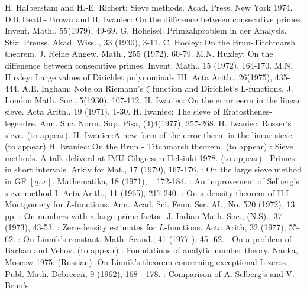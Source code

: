 \begin{thebibliography}{99}
 { H. Halberstam and H.-E. Richert}: Sieve methods. Acad,
  Press, New York 1974. 
 { D.R Heath- Brown and H. Iwaniec}: On the difference
  between consecutive primes. Invent. Math., 55(1979), 49-69. 
 {G. Hoheisel}: Primzahproblem in der
  Analysis. Stiz. Preuss. Akad. Wiss.., 33 (1930), 3-11. 
 { C. Hooley}: On the Brun-Titchmarsh theorem. J. Reine
  Angew. Math.,  255 (1972). 60-79. 
 { M.N. Huxley}: On the diffenence between consecutive
  primes. Invent. Math., 15 (1972), 164-170. 
 { M.N. Huxley}: Large values of Dirichlet polynominals
  III. Acta Arith., 26(1975), 435-444. 
 { A.E. Ingham}: Note on Riemann's $\zeta$ function and
  Dirichlet's L-functions. J. London Math. Soc., 5(1930), 107-112. 
 { H.  Iwaniec}: On the error eerm in the linear
  sieve. Acta Arith., 19 (1971), 1-30. 
 { H. Iwaniec}: The sieve of Eratosthenes-
  legendre. Ann. Suc. Norm. Sup. Pisa, (4)4(1977), 257-268. 
 { H.  Iwaniec}: Rosser's sieve. (to appear). 
 { H. Iwaniec}:\pageoriginale A new  form of the error-therm in the
  linear sieve. (to appear) 
 {H. Iwaniec}: On the Brun - Titchmarsh theorem. (to appear)
: Sieve methods. A talk deliverd at   IMU
  Cibgressm Helsinki 1978. (to appear) 
: Primes in short
  intervals. Arkiv for  Mat., 17 (1979),  167-176. 
: On the large sieve method in  GF
  $[q,x]$. Mathematika,  18 (1971), ~ 172-184.  
: An improvement of
  Selberg's sieve method I. Acta Arith., 11 (1965),  217-240. 
: On a density theorem of H.L. Montgomery for
  $L$-functions. Ann. Acad. Sci. Fenn. Ser. AI., No. 520 (1972), 13 pp. 
: On numbers with a large  prime factor.  J.
  Indian  Math.  Soc.,   (N.S)., 37 (1973), 43-53. 
: Zero-density estimates for
  $L$-functions. Acta  Arith, 32 (1977), 55-62. 
: On Linnik's constant. Math. Scand.,  41 (1977
  ),  45 -62.  
: On a problem of  Barban and Vehov. (to appear)
: Foundations of analytic number
  theory. Nauka, Moscow  1975. (Russian) 
:\pageoriginale On Linnik's theorem concerning exceptional
  L-zeros. Publ. Math. Debrecen, 9 (1962), 168 - 178.  
: Comparison of A. Selberg's and  V. Brun's

\end{thebibliography}
